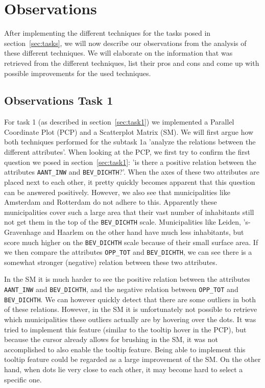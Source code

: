 \section{Observations}\label{sec:observations}
After implementing the different techniques for the tasks posed in section~\ref{sec:tasks}, we will now describe our observations from the analysis of these different techniques. We will elaborate on the information that was retrieved from the different techniques, list their pros and cons and come up with possible improvements for the used techniques.

\subsection{Observations Task 1}
For task 1 (as described in section~\ref{sec:task1}) we implemented a Parallel Coordinate Plot (PCP) and a Scatterplot Matrix (SM). We will first argue how both techniques performed for the subtask 1a 'analyze the relations between the different attributes'. When looking at the PCP, we first try to confirm the first question we posed in section~\ref{sec:task1}: 'is there a positive relation between the attributes \texttt{AANT\_INW} and \texttt{BEV\_DICHTH}?'. When the axes of these two attributes are placed next to each other, it pretty quickly becomes apparent that this question can be answered positively. However, we also see that municipalities like Amsterdam and Rotterdam do not adhere to this. Apparently these municipalities cover such a large area that their vast number of inhabitants still not get them in the top of the \texttt{BEV\_DICHTH} scale. Municipalities like Leiden, 's-Gravenhage and Haarlem on the other hand have much less inhabitants, but score much higher on the \texttt{BEV\_DICHTH} scale because of their small surface area. If we then compare the attributes \texttt{OPP\_TOT} and \texttt{BEV\_DICHTH}, we can see there is a somewhat stronger (negative) relation between these two attributes.

In the SM it is much harder to see the positive relation between the attributes \texttt{AANT\_INW} and \texttt{BEV\_DICHTH}, and the negative relation between \texttt{OPP\_TOT} and \texttt{BEV\_DICHTH}. We can however quickly detect that there are some outliers in both of these relations. However, in the SM it is unfortunately not possible to retrieve which municipalities these outliers actually are by hovering over the dots. It was tried to implement this feature (similar to the tooltip hover in the PCP), but because the cursor already allows for brushing in the SM, it was not accomplished to also enable the tooltip feature. Being able to implement this tooltip feature could be regarded as a large improvement of the SM. On the other hand, when dots lie very close to each other, it may become hard to select a specific one.

